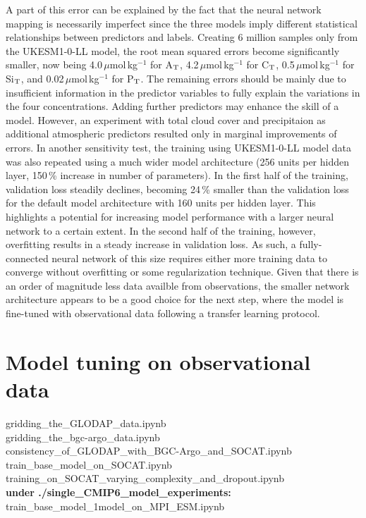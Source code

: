 \documentclass{article}
\begin{document}
	A part of this error can be explained by the fact that the neural network mapping is necessarily imperfect since the three models imply different statistical relationships between predictors and labels. Creating 6 million samples only from the UKESM1-0-LL model, the root mean squared errors become significantly smaller, now being 4.0\,$\mu$mol\,kg$^{-1}$ for A$_\textup{T}$, 4.2\,$\mu$mol\,kg$^{-1}$ for C$_\textup{T}$, 0.5\,$\mu$mol\,kg$^{-1}$ for Si$_\textup{T}$, and 0.02\,$\mu$mol\,kg$^{-1}$ for P$_\textup{T}$. The remaining errors should be mainly due to insufficient information in the predictor variables to fully explain the variations in the four concentrations. Adding further predictors may enhance the skill of a model. However, an experiment with total cloud cover and precipitaion as additional atmospheric predictors resulted only in marginal improvements of errors. In another sensitivity test, the training using UKESM1-0-LL model data was also repeated using a much wider model architecture (256 units per hidden layer, 150\,\% increase in number of parameters). In the first half of the training, validation loss steadily declines, becoming 24\,\% smaller than the validation loss for the default model architecture with 160 units per hidden layer. This highlights a potential for increasing model performance with a larger neural network to a certain extent. In the second half of the training, however, overfitting results in a steady increase in validation loss. As such, a fully-connected neural network of this size requires either more training data to converge without overfitting or some regularization technique. Given that there is an order of magnitude less data availble from observations, the smaller network architecture appears to be a good choice for the next step, where the model is fine-tuned with observational data following a transfer learning protocol. 
	
	\section{Model tuning on observational data} \label{sect:obs-tuning}
	\begin{tcolorbox}[colback=gray!5!white, colframe=black!75!white, 
	fonttitle=\bfseries, title=Jupyter Notebooks, 
	rounded corners, width=\textwidth]
	gridding\_the\_GLODAP\_data.ipynb \\
	gridding\_the\_bgc-argo\_data.ipynb \\
	consistency\_of\_GLODAP\_with\_BGC-Argo\_and\_SOCAT.ipynb \\
	train\_base\_model\_on\_SOCAT.ipynb \\
	training\_on\_SOCAT\_varying\_complexity\_and\_dropout.ipynb \\
	\textbf{under ./single\_CMIP6\_model\_experiments:} \\
	train\_base\_model\_1model\_on\_MPI\_ESM.ipynb
	\end{tcolorbox}
\end{document}
